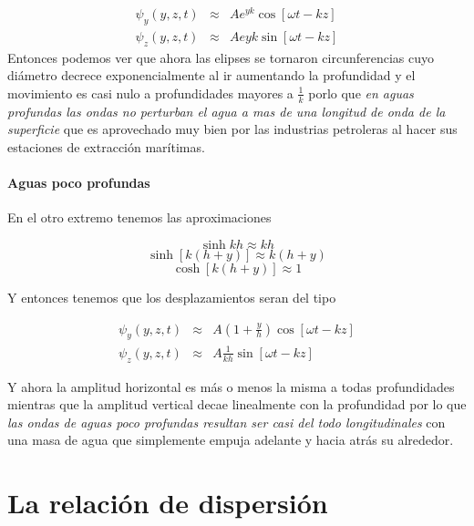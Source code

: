 \documentclass[a4paper,spanish]{article}
\numberwithin{equation}{section}
\begin{document}
\[
\begin{array}{rcl}
\psi_y(y,z,t) & \approx & Ae^{yk}\cos[ \omega t -kz] \\
\psi_z(y,z,t) & \approx & Ae{yk}\sin[ \omega t -kz] 
\end{array}
\]
Entonces podemos ver que ahora las elipses se tornaron circunferencias cuyo di\'ametro decrece exponencialmente al ir aumentando la profundidad y el movimiento es casi nulo a profundidades mayores a $\frac{1}{k}$ porlo que \textit{en aguas profundas las ondas no perturban el agua a mas de una longitud de onda de la superficie} que es aprovechado muy bien por las industrias petroleras al hacer sus estaciones de extracci\'on mar\'itimas.

\paragraph{Aguas poco profundas}
En el otro extremo tenemos las aproximaciones

\[\sinh{kh} \approx kh \]
\[\sinh[k(h+y)] \approx k(h+y)\]
\[\cosh[k(h+y)] \approx 1\]

Y entonces tenemos que los desplazamientos seran del tipo 

\begin{equation}
\begin{array}{rcl}
\psi_y(y,z,t) & \approx & A(1+\frac{y}{h})\cos[ \omega t -kz] \\
\psi_z(y,z,t) & \approx & A\frac{1}{kh}\sin[ \omega t -kz] 
\end{array}
\label{agua_poco_prof}
\end{equation}

Y ahora la amplitud horizontal es m\'as o menos la misma a todas profundidades mientras que la amplitud vertical decae linealmente con la profundidad por lo que \textit{las ondas de aguas poco profundas resultan ser casi del todo longitudinales} con una masa de agua que simplemente empuja adelante y hacia atr\'as su alrededor.

\section{La relaci\'on de dispersi\'on}
\end{document}

